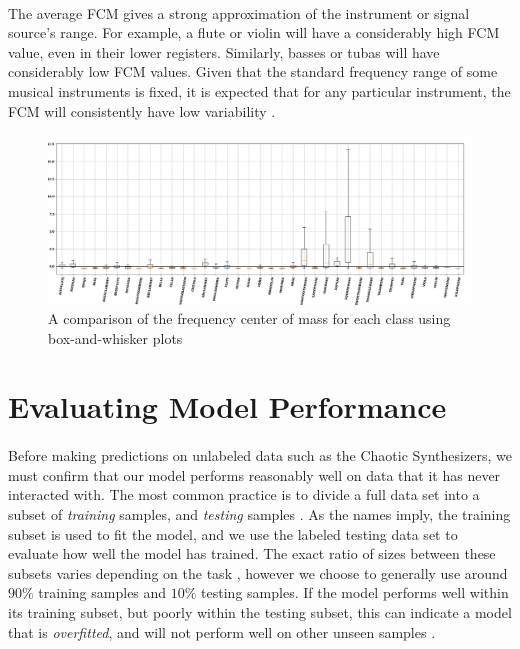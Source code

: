 \documentclass[12pt,letterpaper]{article}
\begin{document}
\paragraph*{}The average FCM gives a strong approximation of the instrument or signal source's range. For example, a flute or violin will have a considerably high FCM value, even in their lower registers. Similarly, basses or tubas will have considerably low FCM values. Given that the standard frequency range of some musical instruments is fixed, it is expected that for any particular instrument, the FCM will consistently have low variability \cite{Olson,White}.

\begin{figure}[H]
\label{fig-FeatureFCM}
\begin{center}
\includegraphics[scale=0.3]{../FiguresFeatures/FCM}
\end{center}
\caption{A comparison of the frequency center of mass for each class using box-and-whisker plots}
\end{figure}


\newpage
\section{Evaluating Model Performance}
\label{sec-PerfEval}

\paragraph*{}Before making predictions on unlabeled data such as the Chaotic Synthesizers, we must confirm that our model performs reasonably well on data that it has never interacted with. The most common practice is to divide a full data set into a subset of \textit{training} samples, and \textit{testing} samples \cite{Geron}. As the names imply, the training subset is used to fit the model, and we use the labeled testing data set to evaluate how well the model has trained. The exact ratio of sizes between these subsets varies depending on the task \cite{Goodfellow,Geron2,Mitchell}, however we choose to generally use around $90\%$ training samples and $10\%$ testing samples. If the model performs well within its training subset, but poorly within the testing subset, this can indicate a model that is \textit{overfitted}, and will not perform well on other unseen samples \cite{Geron}.
\end{document}
